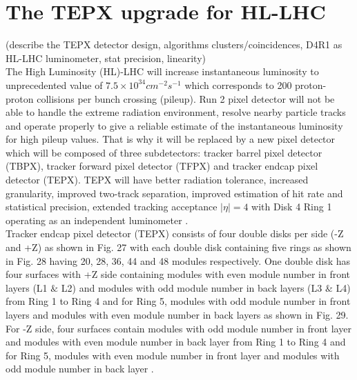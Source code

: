 \newpage \section{The TEPX upgrade for HL-LHC}
\label{sec:tepx}
(describe the TEPX detector design, algorithms clusters/coincidences, D4R1 as HL-LHC luminometer, stat precision, linearity)\\

The High Luminosity (HL)-LHC will increase instantaneous luminosity to unprecedented value of $7.5 \times 10^{34} cm^{-2} s^{-1}$ which corresponds to 200 proton-proton collisions per bunch crossing (pileup). Run 2 pixel detector will not be able to handle the extreme radiation environment, resolve nearby particle tracks and operate properly to give a reliable estimate of the instantaneous luminosity for high pileup values. That is why it will be replaced by a new pixel detector which will be composed of three subdetectors: tracker barrel pixel detector (TBPX), tracker forward pixel detector (TFPX) and tracker endcap pixel detector (TEPX). TEPX will have better radiation tolerance, increased granularity, improved two-track separation, improved estimation of hit rate and statistical precision, extended tracking acceptance $|\eta|=4$ with Disk 4 Ring 1 operating as an independent luminometer \cite{Klein:2017nke}. \\

Tracker endcap pixel detector (TEPX) consists of four double disks per side (-Z and +Z) as shown in Fig. 27 with each double disk containing five rings as shown in Fig. 28 having 20, 28, 36, 44 and 48 modules respectively. One double disk has four surfaces with +Z side containing modules with even module number in front layers (L1 $\&$ L2) and modules with odd module number in back layers (L3 $\&$ L4) from Ring 1 to Ring 4 and for Ring 5, modules with odd module number in front layers and modules with even module number in back layers as shown in Fig. 29. For -Z side, four surfaces contain modules with odd module number in front layer and modules with even module number in back layer from Ring 1 to Ring 4 and for Ring 5, modules with even module number in front layer and modules with odd module number in back layer . \\


